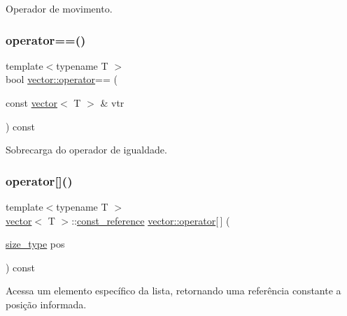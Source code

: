 Operador de movimento. 

\mbox{\label{classsc_1_1vector_a14470a2d43b26c15f0f7aaeeb6ae4f04}} 
\subsubsection{\texorpdfstring{operator==()}{operator==()}}
{\footnotesize\ttfamily template$<$typename T $>$ \\
bool \hyperlink{classsc_1_1vector_a889e37c4415a33fb90d8b564bf428e24}{vector\+::operator}== (\begin{DoxyParamCaption}\item[{const \hyperlink{classsc_1_1vector}{vector}$<$ T $>$ \&}]{vtr }\end{DoxyParamCaption}) const}



Sobrecarga do operador de igualdade. 

\mbox{\label{classsc_1_1vector_af4883ec0fe8c11c4030200fde515eec7}} 
\subsubsection{\texorpdfstring{operator[]()}{operator[]()}\hspace{0.1cm}{\footnotesize\ttfamily [1/2]}}
{\footnotesize\ttfamily template$<$typename T $>$ \\
\hyperlink{classsc_1_1vector}{vector}$<$ T $>$\+::\hyperlink{classsc_1_1vector_a8da2b1a11b069241100f9b2e14f481a0}{const\+\_\+reference} \hyperlink{classsc_1_1vector_a889e37c4415a33fb90d8b564bf428e24}{vector\+::operator}\mbox{[}$\,$\mbox{]} (\begin{DoxyParamCaption}\item[{\hyperlink{classsc_1_1vector_a48bf37ba1a6d0c13504414d86e27c399}{size\+\_\+type}}]{pos }\end{DoxyParamCaption}) const}



Acessa um elemento específico da lista, retornando uma referência constante a posição informada. 

\mbox{\label{classsc_1_1vector_aab84734555f16bbb8a33f5e20257349d}} 

